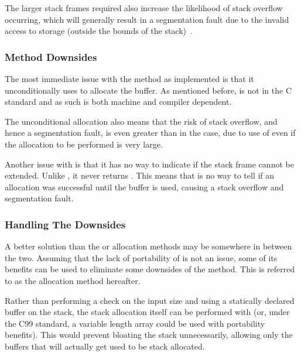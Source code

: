 The larger stack frames required also increase the likelihood of stack overflow occurring, which will generally result in a segmentation fault due to the invalid access to storage (outside the bounds of the stack)~\cite{c11std}.

\subsubsection{ Method Downsides}

The most immediate issue with the  method as implemented is that it unconditionally uses  to allocate the buffer. As mentioned before,  is not in the C standard and as such is both machine and compiler dependent.

The unconditional allocation also means that the risk of stack overflow, and hence a segmentation fault, is even greater than in the  case, due to use of  even if the allocation to be performed is very large.

Another issue with  is that it has no way to indicate if the stack frame cannot be extended. Unlike \malloc{}, it never returns . This means that is no way to tell if an allocation was successful until the buffer is used, causing a stack overflow and segmentation fault.

\subsubsection{Handling The Downsides}

A better solution than the  or  allocation methods may be somewhere in between the two. Assuming that the lack of portability of  is not an issue, some of its benefits can be used to eliminate some downsides of the  method. This is referred to as the  allocation method hereafter.

Rather than performing a check on the input size and using a statically declared buffer on the stack, the stack allocation itself can be performed with  (or, under the C99 standard, a variable length array could be used with portability benefits). This would prevent bloating the stack unnecessarily, allowing only the buffers that will actually get used to be stack allocated.

